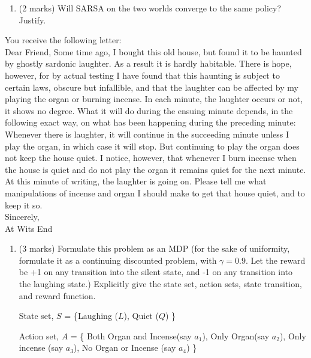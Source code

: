 \documentclass[addpoints,12pt,solution]{exam}
\begin{document}
\begin{questions}
\begin{enumerate}[label=(\alph*)]
\begin{solution}
\end{solution}


\item (2 marks) Will SARSA on the two worlds converge to the same policy? Justify.

\begin{solution}
\end{solution}

\end{enumerate}

\question[7]You receive the following letter:\\
Dear Friend, Some time ago, I bought this old house, but found it to be haunted by
ghostly sardonic laughter. As a result it is hardly habitable. There is hope, however,
for by actual testing I have found that this haunting is subject to certain laws, obscure
but infallible, and that the laughter can be affected by my playing the organ or burning
incense. In each minute, the laughter occurs or not, it shows no degree. What it will
do during the ensuing minute depends, in the following exact way, on what has been
happening during the preceding minute: Whenever there is laughter, it will continue in
the succeeding minute unless I play the organ, in which case it will stop. But continuing
to play the organ does not keep the house quiet. I notice, however, that whenever I
burn incense when the house is quiet and do not play the organ it remains quiet for the
next minute. At this minute of writing, the laughter is going on. Please tell me what
manipulations of incense and organ I should make to get that house quiet, and to keep
it so.\\
Sincerely,\\
At Wits End
\begin{enumerate}[label=(\alph*)]
    \item (3 marks) Formulate this problem as an MDP (for the sake of uniformity, formulate it as a
continuing discounted problem, with $\gamma= 0.9$. Let the reward be +1 on any transition
into the silent state, and -1 on any transition into the laughing state.) Explicitly give the
state set, action sets, state transition, and reward function.
\begin{solution}
State set, {$S$} = \{Laughing ($L$), Quiet ($Q$) \}

Action set, {$A$} = \{ Both Organ and Incense(say $a_{1}$), Only Organ(say $a_{2}$), Only incense (say $a_{3}$), No Organ or Incense (say $a_{4}$) \}


\end{solution}
\end{enumerate}
\end{questions}
\end{document}
